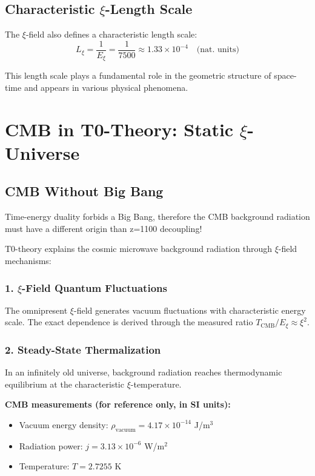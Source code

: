 \documentclass[12pt,a4paper]{article}
\theoremstyle{definition}
\theoremstyle{remark}
\begin{document}
	\subsection{Characteristic $\xi$-Length Scale}
	
	The $\xi$-field also defines a characteristic length scale:
	\begin{equation}
		L_\xi = \frac{1}{E_\xi} = \frac{1}{7500} \approx 1.33 \times 10^{-4} \quad \text{(nat. units)}
	\end{equation}
	
	This length scale plays a fundamental role in the geometric structure of space-time and appears in various physical phenomena.
	
	\section{CMB in T0-Theory: Static $\xi$-Universe}
	
	\subsection{CMB Without Big Bang}
	
	\begin{revolutionary}
		Time-energy duality forbids a Big Bang, therefore the CMB background radiation must have a different origin than z=1100 decoupling!
	\end{revolutionary}
	
	T0-theory explains the cosmic microwave background radiation through $\xi$-field mechanisms:
	
	\subsubsection{1. $\xi$-Field Quantum Fluctuations}
	The omnipresent $\xi$-field generates vacuum fluctuations with characteristic energy scale. The exact dependence is derived through the measured ratio $T_{\text{CMB}}/E_\xi \approx \xi^2$.
	
	\subsubsection{2. Steady-State Thermalization}
	In an infinitely old universe, background radiation reaches thermodynamic equilibrium at the characteristic $\xi$-temperature.
	
	\begin{sibox}
		\textbf{CMB measurements (for reference only, in SI units):}
		\begin{itemize}
			\item Vacuum energy density: $\rho_{\text{vacuum}} = 4.17 \times 10^{-14}$ J/m$^3$
			\item Radiation power: $j = 3.13 \times 10^{-6}$ W/m$^2$
			\item Temperature: $T = 2.7255$ K
		\end{itemize}
	\end{sibox}
	
\end{document}
